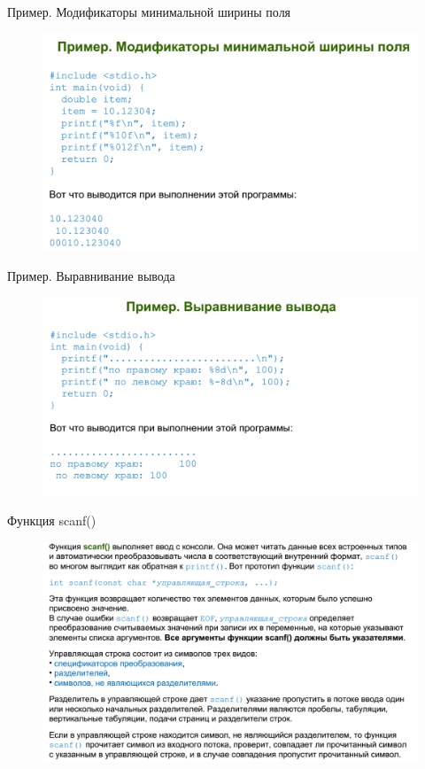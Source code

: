 \documentclass{beamer}
\begin{document}
\begin{frame}{Пример. Модификаторы минимальной ширины поля}
\begin{figure}[h]
\centering
\includegraphics[scale=0.4]{images/lec02-pic31.png}
\end{figure}
\end{frame}

\begin{frame}{Пример. Выравнивание вывода}
\begin{figure}[h]
\centering
\includegraphics[scale=0.4]{images/lec02-pic32.png}
\end{figure}
\end{frame}

\begin{frame}{Функция scanf()}
\begin{figure}[h]
\centering
\includegraphics[scale=0.4]{images/lec02-pic33.png}
\end{figure}
\end{frame}
\end{document}
